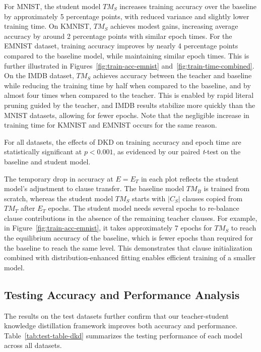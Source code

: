 \documentclass[sn-mathphys-num]{sn-jnl}%
\theoremstyle{thmstyleone}%
\theoremstyle{thmstyletwo}%
\theoremstyle{thmstylethree}%
\begin{document}
For MNIST, the student model $TM_S$ increases training accuracy over the baseline by approximately 5 percentage points, with reduced variance and slightly lower training time. On KMNIST, $TM_S$ achieves modest gains, increasing average accuracy by around 2 percentage points with similar epoch times. 
For the EMNIST dataset, training accuracy improves by nearly 4 percentage points compared to the baseline model, while maintaining similar epoch times. This is further illustrated in Figures~\ref{fig:train-acc-emnist} and~\ref{fig:train-time-combined}. 
On the IMDB dataset, $TM_S$ achieves accuracy between the teacher and baseline while reducing the training time by half when compared to the baseline, and by almost four times when compared to the teacher. This is enabled by rapid literal pruning guided by the teacher, and IMDB results stabilize more quickly than the MNIST datasets, allowing for fewer epochs.
Note that the negligible increase in training time for KMNIST and EMNIST occurs for the same reason.

For all datasets, the effects of DKD on training accuracy and epoch time are statistically significant at $p<0.001$, as evidenced by our paired \textit{t}-test on the baseline and student model.

The temporary drop in accuracy at $E = E_T$ in each plot reflects the student model's adjustment to clause transfer. The baseline model $TM_B$ is trained from scratch, whereas the student model $TM_S$ starts with $|C_S|$ clauses copied from $TM_T$ after $E_T$ epochs. The student model needs several epochs to re-balance clause contributions in the absence of the remaining teacher clauses. For example, in Figure~\ref{fig:train-acc-emnist}, it takes approximately 7 epochs for $TM_S$ to reach the equilibrium accuracy of the baseline, which is fewer epochs than required for the baseline to reach the same level. This demonstrates that clause initialization combined with distribution-enhanced fitting enables efficient training of a smaller model.

\subsection{Testing Accuracy and Performance Analysis}

The results on the test datasets further confirm that our teacher-student knowledge distillation framework improves both accuracy and performance. Table~\ref{tab:test-table-dkd} summarizes the testing performance of each model across all datasets.
\end{document}

